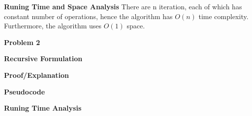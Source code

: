 \documentclass[12pt,article]{article}
\newenvironment{problem}[2][Problem]
    { \begin{mdframed}[backgroundcolor=gray!20] \textbf{#1 #2} \\}
    {  \end{mdframed}}
\begin{document}
\textbf{Runing Time and Space Analysis}
There are n iteration, each of which has constant number of operations, hence the algorithm has $O(n)$ time complexity. Furthermore, the algorithm uses $O(1)$ space.

\newpage
\begin{problem}{2} 

\end{problem}

\textbf{Recursive Formulation}

\textbf{Proof/Explanation}

\textbf{Pseudocode}

\textbf{Runing Time Analysis}



\end{document}
